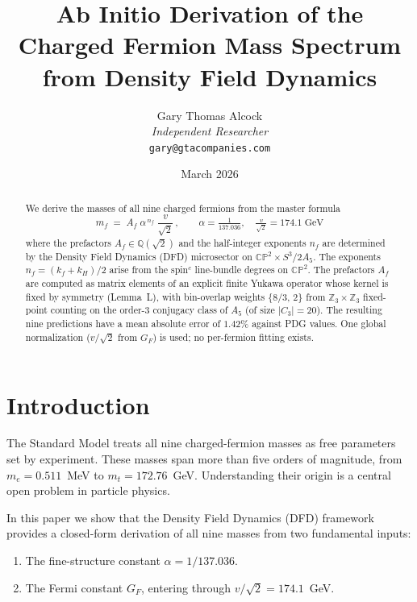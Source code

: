 \documentclass[11pt,a4paper]{article}
\newcommand{\CP}{\mathbb{CP}}
\begin{document}
\title{Ab Initio Derivation of the Charged Fermion Mass Spectrum\\
from Density Field Dynamics}

\author{Gary Thomas Alcock\\
\textit{Independent Researcher}\\
\texttt{gary@gtacompanies.com}}

\date{March 2026}

\maketitle

\begin{abstract}
We derive the masses of all nine charged fermions from the master formula
\[
\boxed{\quad m_f \;=\; A_f\;\alpha^{\,n_f}\;\frac{v}{\sqrt{2}}\,,
\qquad \alpha = \tfrac{1}{137.036},\quad \tfrac{v}{\sqrt{2}} = 174.1\;\text{GeV}\quad}
\]
where the prefactors $A_f\in\mathbb{Q}(\sqrt{2})$ and the half-integer exponents $n_f$
are determined by the Density Field Dynamics (DFD) microsector on
$\CP^2 \times S^3/2A_5$.
The exponents $n_f=(k_f+k_H)/2$ arise from the spin$^c$ line-bundle degrees on $\CP^2$.
The prefactors $A_f$ are computed as matrix elements of an explicit finite Yukawa
operator whose kernel is fixed by symmetry (Lemma~L), with bin-overlap
weights $\{8/3,\,2\}$ from $\mathbb{Z}_3\times\mathbb{Z}_3$ fixed-point counting
on the order-3 conjugacy class of $A_5$ (of size $|C_3|=20$).
The resulting nine predictions have a mean absolute error of $1.42\%$
against PDG values.  One global normalization ($v/\sqrt{2}$ from $G_F$) is used;
no per-fermion fitting exists.
\end{abstract}

\tableofcontents

\section{Introduction}
\label{sec:intro}

The Standard Model treats all nine charged-fermion masses as free parameters
set by experiment.  These masses span more than five orders of magnitude, from
$m_e = 0.511$~MeV to $m_t = 172.76$~GeV.  Understanding their origin is a
central open problem in particle physics.

In this paper we show that the Density Field Dynamics (DFD) framework provides
a closed-form derivation of all nine masses from two fundamental inputs:
\begin{enumerate}
\item The fine-structure constant $\alpha = 1/137.036$.
\item The Fermi constant $G_F$, entering through $v/\sqrt{2} = 174.1$~GeV.
\end{enumerate}
\end{document}
